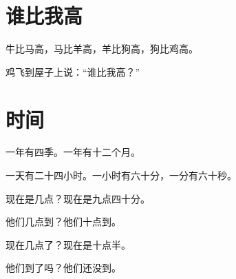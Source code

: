 \documentclass[12pt,UTF-8,openany]{ctexbook}
\begin{document}
\hanzibox{}\hanzibox{}\hanzibox{}\hanzibox{}\hspace{1em}\hanzibox{}\hanzibox{}\hanzibox{}\hanzibox{}

\hanzibox{}\hanzibox{}\hanzibox{}\hanzibox{}\hspace{1em}\hanzibox{}\hanzibox{}\hanzibox{}\hanzibox{}

\hanzibox{}\hanzibox{}\hanzibox{}\hanzibox{}\hspace{1em}




\chapter{谁比我高}

\begin{large}
    
    牛比马高，马比羊高，羊比狗高，狗比鸡高。
    
    鸡飞到屋子上说：“谁比我高？”
    
\end{large}


\clearpage

\begin{center}
    
\end{center}


\hanzibox{}\hanzibox{}\hanzibox{}\hanzibox{}\hspace{1em}\hanzibox{}\hanzibox{}\hanzibox{}\hanzibox{}

\hanzibox{}\hanzibox{}\hanzibox{}\hanzibox{}\hspace{1em}\hanzibox{}\hanzibox{}\hanzibox{}\hanzibox{}






\chapter{时间}

\begin{large}
    
    一年有四季。一年有十二个月。
    
    一天有二十四小时。一小时有六十分，一分有六十秒。
    
    现在是几点？现在是九点四十分。
    
    他们几点到？他们十点到。
    
    现在几点了？现在是十点半。
    
    他们到了吗？他们还没到。
    
\end{large}
\end{document}
